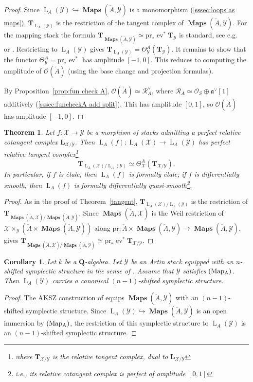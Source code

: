 \documentclass[12pt, oneside]{amsart}
\numberwithin{equation}{section}
\newtheorem{theorem}[subsubsection]{Theorem}
\newtheorem{corollary}[subsubsection]{Corollary}
\theoremstyle{remark}
\theoremstyle{plain}
\DeclareMathOperator{\MAP}{\mathbf{Maps}}
\newcommand{\R}{\mathcal{R}}
\newcommand{\RA}{\R_A}
\newcommand{\frav}{\mathfrak{a}^\vee}
\newcommand{\Loop}{\operatorname{L}}
\newcommand{\OO}{\mathcal{O}}
\newcommand{\YY}{\mathcal{Y}}
\newcommand{\XX}{\mathcal{X}}
\newcommand{\eval}{\operatorname{ev}}
\newcommand{\TT}{\mathbf{T}}
\newcommand{\LL}{\mathbf{L}}
\newcommand{\pr}{\mathrm{pr}}
\begin{document}
\begin{proof} Since $\Loop_A(\YY) \hookrightarrow \MAP(\check{A}, \YY)$ is a monomorphism (\ref{sssec:loops as maps}), $\TT_{\Loop_A(\YY)}$ is the restriction of the tangent complex of $\MAP(\check{A}, \YY)$. For the mapping stack the formula $\TT_{\MAP(\check{A},\YY)} \simeq \mathrm{pr}_* \eval^* \TT_{\YY}$ is standard, see e.g.\ \cite[\S 2.1]{PTVV} or \cite[Prop.~19.1.4.1]{SAG}. Restricting to $\Loop_A(\YY)$ gives $\TT_{\Loop_A(\YY)} = \Theta^A_{\YY}(\TT_{\YY})$. It remains to show that the functor $\Theta^A_{\YY} = \pr_* \eval^*$ has amplitude $[-1, 0]$. This reduces to computing the amplitude of $\OO(\check{A})$ (using the base change and projection formulas).

By Proposition~\ref{prop:fun check A}, $\OO(\check{A}) \simeq \RA^\vee$, where $\RA \simeq \OO_S \oplus \frav[1]$ additively (\ref{sssec:funcheckA add split}). This has amplitude $[0, 1]$, so $\OO(\check{A})$ has amplitude $[-1, 0]$. \end{proof}

\begin{theorem}\label{reltangent} Let $f:\XX\rightarrow\YY$ be a morphism of stacks admitting a perfect relative cotangent complex $\LL_{\XX/\YY}$. Then $\Loop_A(f):\Loop_A(\XX)\rightarrow\Loop_A(\YY)$ has perfect relative tangent complex\footnote{%
  where $\TT_{\XX/\YY}$ is the relative tangent complex, dual to $\LL_{\XX/\YY}$
}
\[ \TT_{\Loop_A(\XX)/\Loop_A(\YY)} \simeq \Theta^A_\XX(\TT_{\XX/\YY}). \]
In particular, if $f$ is étale, then $\Loop_A(f)$ is formally étale; if $f$ is differentially smooth, then $\Loop_A(f)$ is formally differentially quasi-smooth\footnote{%
  i.e., its relative cotangent complex is perfect of amplitude $[0,1]$
}. \end{theorem}
\begin{proof}
As in the proof of Theorem~\ref{tangent}, $\TT_{\Loop_A(\XX)/\Loop_A(\YY)}$ is the restriction of $\TT_{\MAP(\check{A},\XX)/\MAP(\check{A},\YY)}$.
Since $\MAP(\check{A},\XX)$ is the Weil restriction of $\XX\times_{\YY}(\check{A}\times\MAP(\check{A},\YY))$ along $\pr : \check{A}\times\MAP(\check{A},\YY) \to \MAP(\check{A},\YY)$, \cite[Prop.~19.1.4.3]{SAG} gives $\TT_{\MAP(\check{A},\XX)/\MAP(\check{A},\YY)} \simeq \pr_*\eval^*\TT_{\XX/\YY}$.
\end{proof}

\begin{corollary}\label{cor:shifted symplectic}
  Let $k$ be a $\mathbf{Q}$-algebra.
  Let $\YY$ be an Artin stack equipped with an $n$-shifted symplectic structure in the sense of \cite{PTVV}.
  Assume that $\YY$ satisfies $(\textup{Map}\textsubscript{A})$.
  Then $\Loop_A(\YY)$ carries a canonical $(n-1)$-shifted symplectic structure.
\end{corollary}
\begin{proof}
  The AKSZ construction of \cite[Thm.~2.5]{PTVV} equips $\MAP(\check{A}, \YY)$ with an $(n-1)$-shifted symplectic structure.
  Since $\Loop_A(\YY) \hookrightarrow \MAP(\check{A}, \YY)$ is an open immersion by $(\textup{Map}\textsubscript{A})$, the restriction of this symplectic structure to $\Loop_A(\YY)$ is an $(n-1)$-shifted symplectic structure.
\end{proof}
\end{document}
